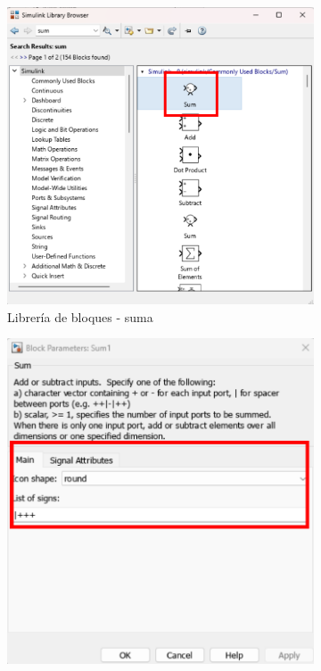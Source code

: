 \begin{figure}[htbp]
    \centering
    \begin{subfigure}[b]{0.35\textwidth}
        \centering
        \includegraphics[width=\textwidth]{fig/Capitulo5/Caso_de_estudio_PID/lib_suma.pdf}
        \caption{Librería de bloques - suma}
        \label{fig:lib_bloques_add}
    \end{subfigure}
    \hfill
    \begin{subfigure}[b]{0.45\textwidth}
        \centering
        \includegraphics[width=\textwidth]{fig/Capitulo5/Caso_de_estudio_PID/config_sum_01.pdf}

\end{subfigure}
\end{figure}
